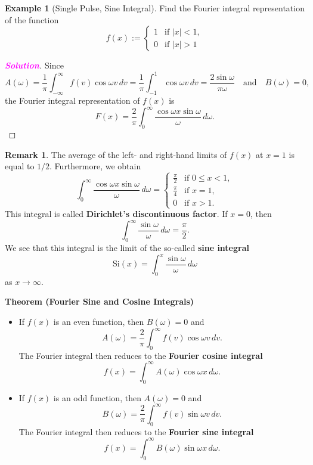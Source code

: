 \documentclass[12pt,openany]{book}
\theoremstyle{definition}
\newtheorem{remark}{Remark}[chapter]
\newtheorem{example}{Example}[chapter]
\newcommand{\sol}{\textcolor{magenta}{\bf Solution}}
\begin{document}
	\vspace{24pt}
	\begin{example}[Single Pulse, Sine Integral]
		Find the Fourier integral representation of the function
		\[
		f(x) :=
		\begin{cases}
			1 & \text{if } |x| < 1, \\
			0 & \text{if } |x| > 1
		\end{cases}
		\]
		\begin{proof}[\sol]
			Since
			\[
			A(\omega) = \frac{1}{\pi} \int_{-\infty}^{\infty} f(v) \cos \omega v \, dv = \frac{1}{\pi} \int_{-1}^{1} \cos \omega v \, dv = \frac{2 \sin \omega}{\pi \omega} \quad \text{and} \quad B(\omega) = 0,
			\]
			the Fourier integral representation of \( f(x) \) is
			\[
			F(x) = \frac{2}{\pi} \int_{0}^{\infty} \frac{\cos \omega x \sin \omega}{\omega} \, d\omega.
			\]
		\end{proof}
	\end{example}
	
	\newpage
	\begin{remark}
		The average of the left- and right-hand limits of \( f(x) \) at \( x = 1 \) is equal to \( 1/2 \).
		Furthermore, we obtain
			\[
			\int_{0}^{\infty} \frac{\cos \omega x \sin \omega}{\omega} \, d\omega =
			\begin{cases}
				\frac{\pi}{2} & \text{if } 0 \leq x < 1, \\
				\frac{\pi}{4} & \text{if } x = 1, \\
				0 & \text{if } x > 1.
			\end{cases}
			\]
			This integral is called \textbf{Dirichlet’s discontinuous factor}.
			If \( x = 0 \), then
			\[
			\int_{0}^{\infty} \frac{\sin \omega}{\omega} \, d\omega = \frac{\pi}{2}.
			\]
			We see that this integral is the limit of the so-called \textbf{sine integral}
			\[
			\text{Si}(x) = \int_{0}^{x} \frac{\sin \omega}{\omega} \, d\omega
			\]
			as \( x \to \infty \).
	\end{remark}
	

\newpage
	\textbf{Theorem (Fourier Sine and Cosine Integrals)}
	
	\begin{itemize}
		\item If \( f(x) \) is an even function, then \( B(\omega) = 0 \) and
		\[
		A(\omega) = \frac{2}{\pi} \int_{0}^{\infty} f(v) \cos \omega v \, dv.
		\]
		The Fourier integral then reduces to the \textbf{Fourier cosine integral}
		\[
		f(x) = \int_{0}^{\infty} A(\omega) \cos \omega x \, d\omega.
		\]
		
		\item If \( f(x) \) is an odd function, then \( A(\omega) = 0 \) and
		\[
		B(\omega) = \frac{2}{\pi} \int_{0}^{\infty} f(v) \sin \omega v \, dv.
		\]
		The Fourier integral then reduces to the \textbf{Fourier sine integral}
		\[
		f(x) = \int_{0}^{\infty} B(\omega) \sin \omega x \, d\omega.
		\]
	\end{itemize}
	
\end{document}
